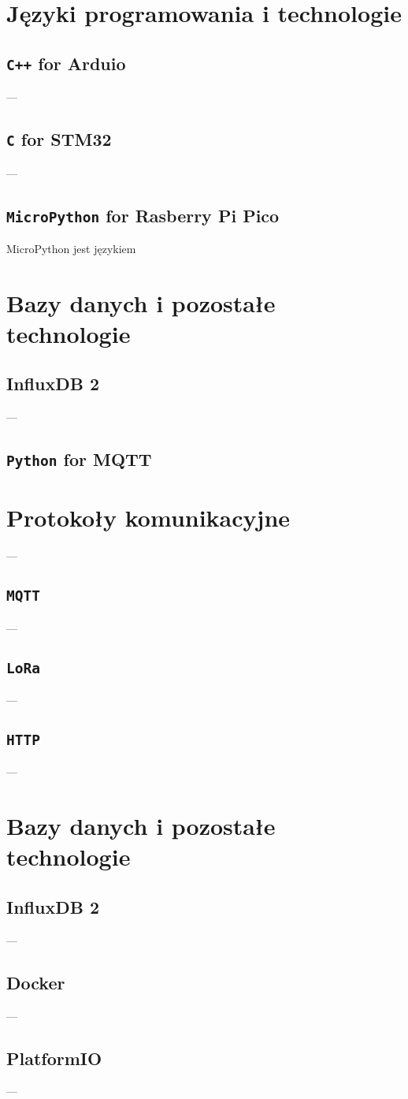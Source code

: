 \section{Języki programowania i technologie}
\subsection{\texttt{C++} for Arduio}
---
\subsection{\texttt{C} for STM32}
---
\subsection{\texttt{MicroPython} for Rasberry Pi Pico}
MicroPython jest językiem 

\section{Bazy danych i pozostałe technologie}
\subsection{InfluxDB 2}
---
\subsection{\texttt{Python} for MQTT}

\section{Protokoły komunikacyjne}
---
\subsection{\texttt{MQTT}}
---
\subsection{\texttt{LoRa}}
---
\subsection{\texttt{HTTP}}
---
\section{Bazy danych i pozostałe technologie}
\subsection{InfluxDB 2}
---
\subsection{Docker}
---
\subsection{PlatformIO}
---
